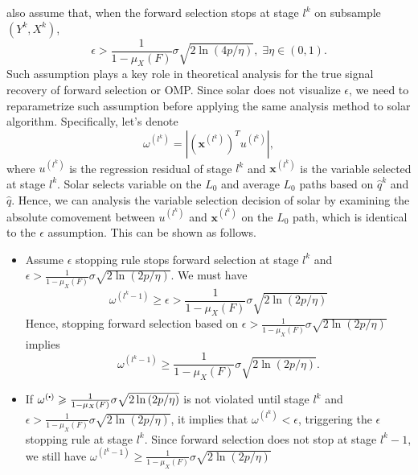 \documentclass[11pt,review,authoryear]{elsarticle}
\begin{document}
\begin{appendices}
\citet{zhang09} also assume that, when the forward selection stops at stage $l^k$ on subsample $\left(Y^{k},X^{k}\right)$, 
%
\begin{displaymath}
  \epsilon>\frac{1}{1-\mu_{X}\left(F\right)}\sigma\sqrt{2\ln\left(4p/\eta\right)}, \; \exists \eta \in \left(0, 1\right). 
\end{displaymath}
%
Such assumption plays a key role in theoretical analysis for the true signal recovery of forward selection or OMP. Since solar does not visualize $\epsilon$, we need to reparametrize such assumption before applying the same analysis method to solar algorithm. Specifically, let's denote 
%
\begin{equation}
  \omega^{\left(l^k\right)} = \left\vert \left( \mathbf{x}^{\left( l^k \right)}\right) ^T u^{\left(l^k \right)} \right\vert,
\end{equation}
%
where $u^{\left( l^k \right)}$ is the regression residual of stage $l^k$ and $\mathbf{x}^{ \left( l^k \right)}$ is the variable selected at stage $l^k$. Solar selects variable on the $L_0$ and average $L_0$ paths based on $\widehat{q}^k$ and $\widehat{q}$. Hence, we can analysis the variable selection decision of solar by examining the absolute comovement between $u^{\left( l^k \right)}$ and $\mathbf{x}^{ \left( l^k \right)}$ on the $L_0$ path, which is identical to the $\epsilon$ assumption. This can be shown as follows.
%
\begin{itemize}
  \item Assume $\epsilon$ stopping rule stops forward selection at stage $l^k$ and $\epsilon > \frac{1}{1-\mu_{X}\left(F\right)}\sigma\sqrt{2\ln\left(2p/\eta\right)}$. We must have 
  \begin{equation}
    \omega^{\left(l^k - 1\right)} \geqslant \epsilon > \frac{1}{1 - \mu_X \left( F \right)} \sigma \sqrt{ 2 \ln \left(2p / \eta \right)}
  \end{equation}
  Hence, stopping forward selection based on $\epsilon > \frac{1}{1 - \mu_X \left( F \right)} \sigma \sqrt{ 2 \ln \left(2p / \eta \right)}$ implies 
  \begin{displaymath}
    \omega^{\left(l^k - 1\right)} \geqslant \frac{1}{1 - \mu_X \left( F \right)} \sigma \sqrt{ 2 \ln \left(2p / \eta \right)}.
  \end{displaymath}
  \item If $\omega^{\left(\bigcdot\right)} \geqslant \frac{1}{1 - \mu_X \left( F \right)} \sigma \sqrt{ 2 \ln \left(2p / \eta \right)}$ is not violated until stage $l^k$ and $\epsilon > \frac{1}{1 - \mu_X \left( F \right)} \sigma \sqrt{ 2 \ln \left(2p / \eta \right)}$, it implies that $\omega^{\left(l^k \right)} < \epsilon$, triggering the $\epsilon$ stopping rule at stage $l^k$. Since forward selection does not stop at stage $l^k-1$, we still have $\omega^{\left(l^k - 1 \right)} \geqslant \frac{1}{1 - \mu_X \left( F \right)} \sigma \sqrt{ 2 \ln \left(2p / \eta \right)}$
\end{itemize}
\medskip


\end{appendices}
\end{document}
